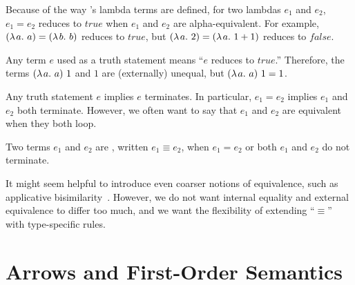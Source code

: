 \documentclass{llncs}
\begin{document}
Because of the way \lzfclang's lambda terms are defined, for two lambdas $\mathit{e}_1$ and $\mathit{e}_2$, $\mathit{e}_1 = \mathit{e}_2$ reduces to $true$ when $\mathit{e}_1$ and $\mathit{e}_2$ are alpha-equivalent.
For example, $(\lambda\mspace{2mu}{a}\ldotp\,{a}) = (\lambda\mspace{2mu}{b}\ldotp\,{b})$ reduces to $true$, but $(\lambda\mspace{2mu}{a}\ldotp\,{2}) = (\lambda\mspace{2mu}{a}\ldotp\,{1+1})$ reduces to $false$.

Any \lzfclang term $\mathit{e}$ used as a truth statement means ``$\mathit{e}$ reduces to $true$.''
Therefore, the terms $(\lambda\mspace{2mu}{a}\ldotp\,{a})~1$ and $1$ are (externally) unequal, but $(\lambda\mspace{2mu}{a}\ldotp\,{a})~1 = 1$.

Any truth statement $\mathit{e}$ implies $\mathit{e}$ terminates.
In particular, $\mathit{e}_1 = \mathit{e}_2$ implies $\mathit{e}_1$ and $\mathit{e}_2$ both terminate.
However, we often want to say that $\mathit{e}_1$ and $\mathit{e}_2$ are equivalent when they both loop.

\begin{definition}
Two \lzfclang terms $\mathit{e_1}$ and $\mathit{e_2}$ are , written $\mathit{e_1} \equiv \mathit{e_2}$, when $\mathit{e_1} = \mathit{e_2}$ or both $\mathit{e_1}$ and $\mathit{e_2}$ do not terminate.
\end{definition}

It might seem helpful to introduce even coarser notions of equivalence, such as applicative bisimilarity~\cite{cit:abramsky-1990rtfp-bisimilarity}.
However, we do not want internal equality and external equivalence to differ too much, and we want the flexibility of extending ``$\equiv$'' with type-specific rules.



\section{Arrows and First-Order Semantics}
\end{document}
